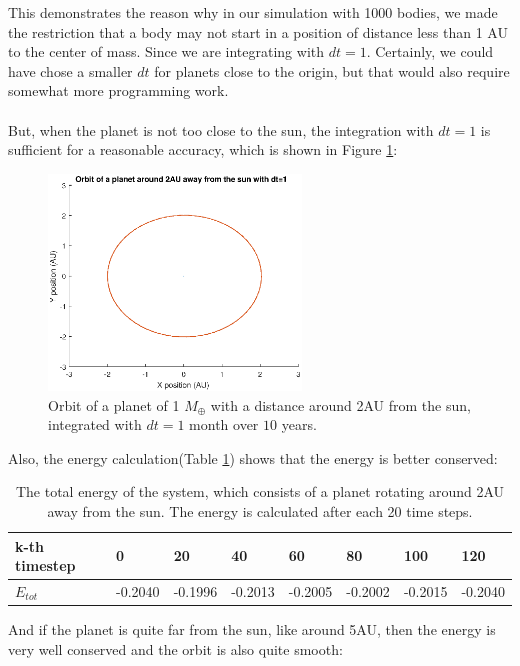 This demonstrates the reason why in our simulation with 1000 bodies, we made the restriction that a body may not start in a position of distance less than 1 AU to the center of mass. Since we are integrating with $dt=1$. Certainly, we could have chose a smaller $dt$ for planets close to the origin, but that would also require somewhat more programming work.\\
\\
But, when the planet is not too close to the sun, the integration with $dt=1$ is sufficient for a reasonable accuracy, which is shown in Figure \ref{fig:Planet2AUdt1}:
\begin{figure}[H]
\centering
\includegraphics[width=0.6\textwidth]{Planeet_2AU_dt1_10jaar.eps}
\caption{Orbit of a planet of 1 $M_{\oplus}$ with a distance around 2AU from the sun, integrated with $dt=1$ month over $10$ years.}
    \label{fig:Planet2AUdt1}
\end{figure}
Also, the energy calculation(Table \ref{tab:Planet2AUEnergy}) shows that the energy is better conserved:
\begin{table}[htb]
\centering
\caption{The total energy of the system, which consists of a planet rotating around 2AU away from the sun. The energy is calculated after each 20 time steps.}
\begin{tabular}{|l|l|l|l|l|l|l|l|}
\hline
k-th timestep&0&20&40&60&80&100&120\\ \hline
$E_{tot}$&-0.2040&   -0.1996&   -0.2013&   -0.2005&   -0.2002&   -0.2015&   -0.2040\\ \hline
\end{tabular}
\label{tab:Planet2AUEnergy}
\end{table}
\newline
And if the planet is quite far from the sun, like around 5AU, then the energy is very well conserved and the orbit is also quite smooth:
